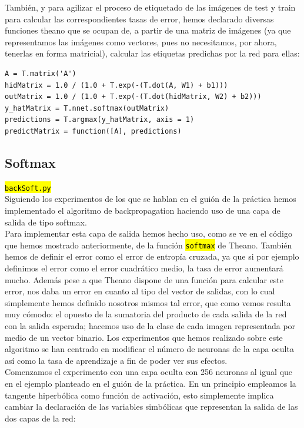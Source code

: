 \documentclass[10pt,a4paper]{article}
\newcommand{\code}[1]{\sethlcolor{light-gray}\hl{\texttt{#1}}} %
\newcommand{\archive}[1]{\sethlcolor{light-green}\hl{\texttt{#1}}} %
\begin{document}
También, y para agilizar el proceso de etiquetado de las imágenes de test y train para calcular las correspondientes tasas de error, hemos declarado diversas funciones theano que se ocupan de, a partir de una matriz de imágenes (ya que representamos las imágenes como vectores, pues no necesitamos, por ahora, tenerlas en forma matricial), calcular las etiquetas predichas por la red para ellas:

\begin{lstlisting}
A = T.matrix('A')
hidMatrix = 1.0 / (1.0 + T.exp(-(T.dot(A, W1) + b1)))
outMatrix = 1.0 / (1.0 + T.exp(-(T.dot(hidMatrix, W2) + b2)))
y_hatMatrix = T.nnet.softmax(outMatrix)
predictions = T.argmax(y_hatMatrix, axis = 1)
predictMatrix = function([A], predictions)
\end{lstlisting}

\subsection{Softmax}
\archive{backSoft.py}\\

Siguiendo los experimentos de los que se hablan en el guión de la práctica hemos implementado el algoritmo de backpropagation haciendo uso de una capa de salida de tipo softmax.\\

Para implementar esta capa de salida hemos hecho uso, como se ve en el código que hemos mostrado anteriormente, de la función \code{softmax} de Theano. También hemos de definir el error como el error de entropía cruzada, ya que si por ejemplo definimos el error como el error cuadrático medio, la tasa de error aumentará mucho. Además pese a que Theano dispone de una función para calcular este error, nos daba un error en cuanto al tipo del vector de salidas, con lo cual simplemente hemos definido nosotros mismos tal error, que como vemos resulta muy cómodo: el opuesto de la sumatoria del producto de cada salida de la red con la salida esperada; hacemos uso de la clase de cada imagen representada por medio de un vector binario. Los experimentos que hemos realizado sobre este algoritmo se han centrado en modificar el número de neuronas de la capa oculta así como la tasa de aprendizaje a fin de poder ver sus efectos.\\

Comenzamos el experimento con una capa oculta con 256 neuronas al igual que en el ejemplo planteado en el guión de la práctica. En un principio empleamos la tangente hiperbólica como función de activación, esto simplemente implica cambiar la declaración de las variables simbólicas que representan la salida de las dos capas de la red:
\end{document}

